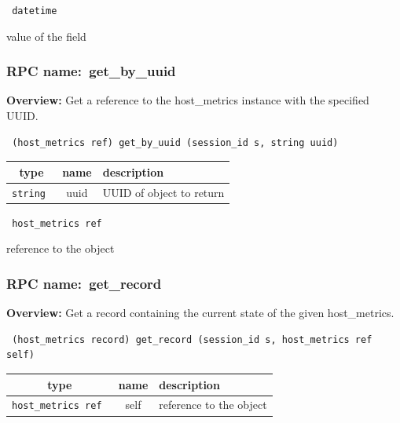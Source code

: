 \vspace{0.3cm}

{\tt 
datetime
}


value of the field
\vspace{0.3cm}
\vspace{0.3cm}
\vspace{0.3cm}
\subsubsection{RPC name:~get\_by\_uuid}

{\bf Overview:} 
Get a reference to the host\_metrics instance with the specified UUID.

\begin{verbatim} (host_metrics ref) get_by_uuid (session_id s, string uuid)\end{verbatim}



 
\vspace{0.3cm}
\begin{tabular}{|c|c|p{7cm}|}
 \hline
{\bf type} & {\bf name} & {\bf description} \\ \hline
{\tt string } & uuid & UUID of object to return \\ \hline 

\end{tabular}

\vspace{0.3cm}

{\tt 
host\_metrics ref
}


reference to the object
\vspace{0.3cm}
\vspace{0.3cm}
\vspace{0.3cm}
\subsubsection{RPC name:~get\_record}

{\bf Overview:} 
Get a record containing the current state of the given host\_metrics.

\begin{verbatim} (host_metrics record) get_record (session_id s, host_metrics ref self)\end{verbatim}



 
\vspace{0.3cm}
\begin{tabular}{|c|c|p{7cm}|}
 \hline
{\bf type} & {\bf name} & {\bf description} \\ \hline
{\tt host\_metrics ref } & self & reference to the object \\ \hline 

\end{tabular}

